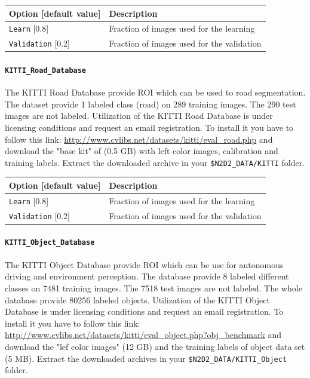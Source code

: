 \documentclass[a4paper,11pt,oneside]{article}
\begin{document}
\begin{center}
 \begin{tabular}{| p{5cm} | p{10cm} | }
 \hline
 Option [default value] & Description\\
 \hline\hline
  \cellcolor{requiredcolor}
  \lstinline!Learn! [0.8] & Fraction of images used for the learning \\
  \lstinline!Validation! [0.2] & Fraction of images used for the validation \\
 \hline
\end{tabular}
\end{center}

\paragraph{\texorpdfstring{%
\lstinline[basicstyle=\ttfamily\bfseries]!KITTI_Road_Database!}
{KITTI_Road\_Database}}
The KITTI Road Database provide ROI which can be used to road segmentation.
The dataset provide 1 labeled class (road) on 289 training images. The 290 test images are not labeled.
 Utilization of the KITTI Road Database
is under licensing conditions and request an email registration. To install it you have to follow this link:
\url{http://www.cvlibs.net/datasets/kitti/eval_road.php}
and download the "base kit" of (0.5 GB) with left color images, calibration and training labels. Extract
the downloaded archive in your \lstinline[basicstyle=\ttfamily\bfseries]!$N2D2_DATA/KITTI! folder.

\begin{center}
 \begin{tabular}{| p{5cm} | p{10cm} | }
 \hline
 Option [default value] & Description\\
 \hline\hline
  \cellcolor{requiredcolor}
  \lstinline!Learn! [0.8] & Fraction of images used for the learning \\
  \lstinline!Validation! [0.2] & Fraction of images used for the validation \\
 \hline
\end{tabular}
\end{center}

\paragraph{\texorpdfstring{%
\lstinline[basicstyle=\ttfamily\bfseries]!KITTI_Object_Database!}
{KITTI_Object\_Database}}
The KITTI Object Database provide ROI which can be use for autonomous driving and environment perception.
The database provide 8 labeled different classes on 7481 training images. The 7518 test images are not labeled.
The whole database provide 80256 labeled objects. Utilization of the KITTI Object Database is under licensing conditions and request an email registration.
To install it you have to follow this link:
\url{http://www.cvlibs.net/datasets/kitti/eval_object.php?obj_benchmark}
and download the "lef color images" (12 GB) and the training labels of object data set (5 MB). Extract
the downloaded archives in your \lstinline[basicstyle=\ttfamily\bfseries]!$N2D2_DATA/KITTI_Object! folder.
\end{document}
